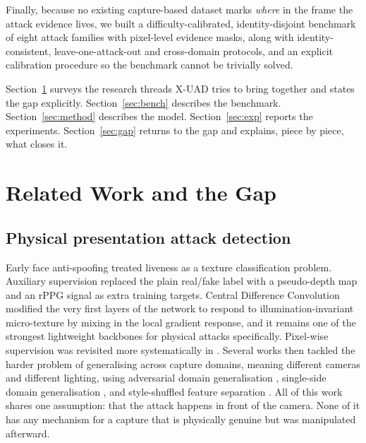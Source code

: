 \documentclass[conference]{IEEEtran}
\begin{document}
Finally, because no existing capture-based dataset marks \emph{where} in the frame
the attack evidence lives, we built a difficulty-calibrated, identity-disjoint
benchmark of eight attack families with pixel-level evidence masks, along with
identity-consistent, leave-one-attack-out and cross-domain protocols, and an
explicit calibration procedure so the benchmark cannot be trivially solved.

Section~\ref{sec:related} surveys the research threads X-UAD tries to bring
together and states the gap explicitly. Section~\ref{sec:bench} describes the
benchmark. Section~\ref{sec:method} describes the model. Section~\ref{sec:exp}
reports the experiments. Section~\ref{sec:gap} returns to the gap and explains,
piece by piece, what closes it.

\section{Related Work and the Gap}\label{sec:related}

\subsection{Physical presentation attack detection}
Early face anti-spoofing treated liveness as a texture classification problem.
Auxiliary supervision \cite{liu2018auxiliary} replaced the plain real/fake label
with a pseudo-depth map and an rPPG signal as extra training targets. Central
Difference Convolution \cite{yu2020cdcn} modified the very first layers of the
network to respond to illumination-invariant micro-texture by mixing in the local
gradient response, and it remains one of the strongest lightweight backbones for
physical attacks specifically. Pixel-wise supervision was revisited more
systematically in \cite{yu2021revisiting}. Several works then tackled the harder
problem of generalising across capture domains, meaning different cameras and
different lighting, using adversarial domain generalisation \cite{shao2019mada},
single-side domain generalisation \cite{jia2020ssdg}, and style-shuffled feature
separation \cite{wang2022ssan}. All of this work shares one assumption: that the
attack happens in front of the camera. None of it has any mechanism for a capture
that is physically genuine but was manipulated afterward.
\end{document}
